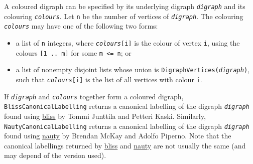 \documentclass[a4paper,11pt]{report}
\begin{document}
{{{ A coloured digraph can be specified by its underlying digraph \mbox{\texttt{\mdseries\slshape digraph}} and its colouring \mbox{\texttt{\mdseries\slshape colours}}. Let \texttt{n} be the number of vertices of \mbox{\texttt{\mdseries\slshape digraph}}. The colouring \mbox{\texttt{\mdseries\slshape colours}} may have one of the following two forms: 

 
\begin{itemize}
\item  a list of \texttt{n} integers, where \mbox{\texttt{\mdseries\slshape colours}}\texttt{[i]} is the colour of vertex \texttt{i}, using the colours \texttt{[1 .. m]} for some \texttt{m {\textless}= n}; or 
\item  a list of non\texttt{}empty disjoint lists whose union is \texttt{DigraphVertices(\mbox{\texttt{\mdseries\slshape digraph}})}, such that \mbox{\texttt{\mdseries\slshape colours}}\texttt{[i]} is the list of all vertices with colour \texttt{i}. 
\end{itemize}
 If \mbox{\texttt{\mdseries\slshape digraph}} and \mbox{\texttt{\mdseries\slshape colours}} together form a coloured digraph, \texttt{BlissCanonicalLabelling} returns a canonical labelling of the digraph \mbox{\texttt{\mdseries\slshape digraph}} found using \href{http://www.tcs.tkk.fi/Software/bliss/} {bliss}  by Tommi Junttila and Petteri Kaski. Similarly, \texttt{NautyCanonicalLabelling} returns a canonical labelling of the digraph \mbox{\texttt{\mdseries\slshape digraph}} found using \href{https://pallini.di.uniroma1.it} {nauty}  by Brendan McKay and Adolfo Piperno. Note that the canonical labellings
returned by \href{http://www.tcs.tkk.fi/Software/bliss/} {bliss}  and \href{https://pallini.di.uniroma1.it} {nauty}  are not usually the same (and may depend of the version used).

}}}
\end{document}
